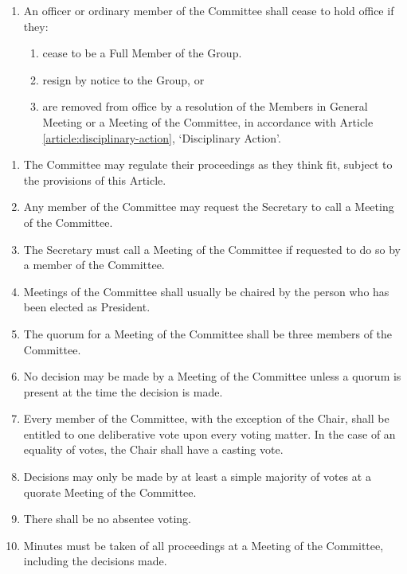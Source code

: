 \documentclass[12pt]{constitution}
\begin{document}
\begin{enumerate}
    \item An officer or ordinary member of the Committee shall cease to hold office if they:
    \begin{enumerate}
        \item cease to be a Full Member of the Group.
        \item resign by notice to the Group, or
        \item are removed from office by a resolution of the Members in General Meeting or a Meeting of the Committee, in accordance with Article \ref{article:disciplinary-action}, `Disciplinary Action'.
    \end{enumerate}
\end{enumerate}


\label{article:meetings-committee}

\begin{enumerate}
    \item The Committee may regulate their proceedings as they think fit, subject to the provisions of this Article.
    \item Any member of the Committee may request the Secretary to call a Meeting of the Committee.
    \item The Secretary must call a Meeting of the Committee if requested to do so by a member of the Committee.
    \item Meetings of the Committee shall usually be chaired by the person who has been elected as President.
    \item The quorum for a Meeting of the Committee shall be three members of the Committee.
    \item No decision may be made by a Meeting of the Committee unless a quorum is present at the time the decision is made.
    \item Every member of the Committee, with the exception of the Chair, shall be entitled to one deliberative vote upon every voting matter. In the case of an equality of votes, the Chair shall have a casting vote.
    \item Decisions may only be made by at least a simple majority of votes at a quorate Meeting of the Committee.
    \item There shall be no absentee voting.
    \item Minutes must be taken of all proceedings at a Meeting of the Committee, including the decisions made.
\end{enumerate}
\end{document}
